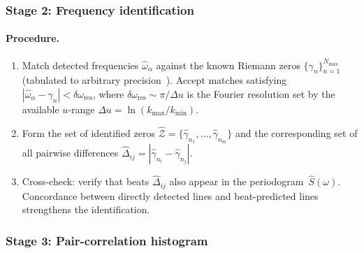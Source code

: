 \documentclass[12pt,a4paper]{article}
\begin{document}
\subsubsection{Stage 2: Frequency identification}

\paragraph{Procedure.}
\begin{enumerate}
\item Match detected frequencies $\hat\omega_\alpha$
  against the known Riemann zeros
  $\{\gamma_n\}_{n=1}^{N_{\max}}$
  (tabulated to arbitrary precision~\cite{LMFDB}).
  Accept matches satisfying
  $|\hat\omega_\alpha - \gamma_n| <
  \delta\omega_{\mathrm{res}}$,
  where $\delta\omega_{\mathrm{res}}
  \sim \pi/\Delta u$ is the Fourier
  resolution set by the available
  $u$-range $\Delta u = \ln(k_{\max}/k_{\min})$.

\item Form the set of identified zeros
  $\hat{\mathcal{Z}}
  = \{\hat\gamma_{n_1},\dots,\hat\gamma_{n_m}\}$
  and the corresponding set of all pairwise differences
  $\hat{\Delta}_{ij}
  = |\hat\gamma_{n_i} - \hat\gamma_{n_j}|$.

\item Cross-check: verify that beats
  $\hat\Delta_{ij}$ also appear in the
  periodogram~$\hat{S}(\omega)$.
  Concordance between directly detected lines and
  beat-predicted lines strengthens the identification.
\end{enumerate}

\subsubsection{Stage 3: Pair-correlation histogram}
\end{document}
